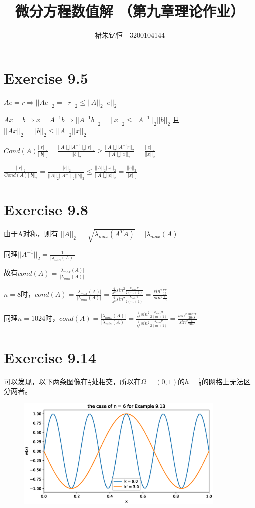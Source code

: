 \documentclass{article}
\title{\Huge \textbf {微分方程数值解 （第九章理论作业）} }
\author{褚朱钇恒 - 3200104144}
\begin{document}
\maketitle

\section{Exercise 9.5}
$Ae = r \Rightarrow ||Ae||_2=||r||_2\le ||A||_2||e||_2$


$Ax = b \Rightarrow x = A^{-1}b \Rightarrow ||A^{-1}b||_2=||x||_2\le ||A^{-1}||_2||b||_2$ 且 $||Ax||_2=||b||_2\le ||A||_2||x||_2$

$Cond(A)\frac{||r||_2}{||b||_2}=\frac{||A||_2||A^{-1}||_2||r||_2}{||b||_2}\ge \frac{||A||_2||A^{-1}r||_2}{||A||_2||x||_2}=\frac{||e||_2}{||x||_2}$

$\frac{||r||_2}{Cond(A)||b||_2}= \frac{||r||_2}{||A||_2||A^{-1}||_2||b||_2} \le \frac{||A||_2||x||_2}{||A||_2||e||_2} =\frac{||e||_2}{||x||_2}$

\section{Exercise 9.8}
由于A对称，则有
$||A||_2=\sqrt[]{\lambda_{max}(A^TA)}=|\lambda_{max}(A)|$

同理$||A^{-1}||_2=\frac{1}{|\lambda_{min}(A)|}$

故有$cond(A)=\frac{|\lambda_{max}(A)|}{|\lambda_{min}(A)|}$

$n=8$时，$cond(A)=\frac{|\lambda_{max}(A)|}{|\lambda_{min}(A)|}=\frac{\frac{4}{h^2}sin^2\frac{k_{max}\pi}{2(m+1)}}{\frac{4}{h^2}sin^2\frac{k_{min}\pi}{2(m+1)}}=\frac{sin^2\frac{7\pi}{16}}{sin^2\frac{\pi}{16}}$

同理$n=1024$时，$cond(A)=\frac{|\lambda_{max}(A)|}{|\lambda_{min}(A)|}=\frac{\frac{4}{h^2}sin^2\frac{k_{max}\pi}{2(m+1)}}{\frac{4}{h^2}sin^2\frac{k_{min}\pi}{2(m+1)}}=\frac{sin^2\frac{1023\pi}{2048}}{sin^2\frac{\pi}{2048}}$

\section{Exercise 9.14}
可以发现，以下两条图像在$\frac{i}{n}$处相交，所以在$\Omega=(0,1)$的$h=\frac{1}{6}$的网格上无法区分两者。
\begin{figure}[H]
    \centering
    \includegraphics[width=10cm]{./9_14.eps}
\end{figure}
\end{document}

